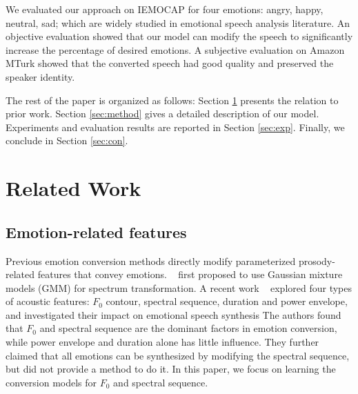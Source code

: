 \documentclass{article}
\begin{document}

We evaluated our approach on IEMOCAP \cite{busso2008iemocap} for four emotions: angry, happy, neutral, sad; which are widely studied in emotional speech analysis literature.
An objective evaluation showed that our model can modify the speech to significantly increase the percentage of desired emotions. A subjective evaluation on Amazon MTurk showed that the converted speech had good quality and preserved the speaker identity.

The rest of the paper is organized as follows: Section \ref{sec:related} presents the relation to prior work. Section \ref{sec:method} gives a detailed description of our model. Experiments and evaluation results are reported in Section \ref{sec:exp}. Finally, we conclude in Section \ref{sec:con}.




\section{Related Work}
\label{sec:related}

\subsection{Emotion-related features}
Previous emotion conversion methods directly modify parameterized prosody-related features that convey emotions. ~\cite{kawanami2003gmm} first proposed to use Gaussian mixture models (GMM) for spectrum transformation.
A recent work ~\cite{xue2018voice} explored four types of acoustic features: $F_0$ contour, spectral sequence, duration and power envelope, and investigated their impact on emotional speech synthesis
The authors found that $F_0$ and spectral sequence are the dominant factors in emotion conversion, while power envelope and duration alone has little influence. They further claimed that all emotions can be synthesized by modifying the spectral sequence, but did not provide a method to do it. In this paper, we focus on learning the conversion models for $F_0$ and spectral sequence.
\end{document}
